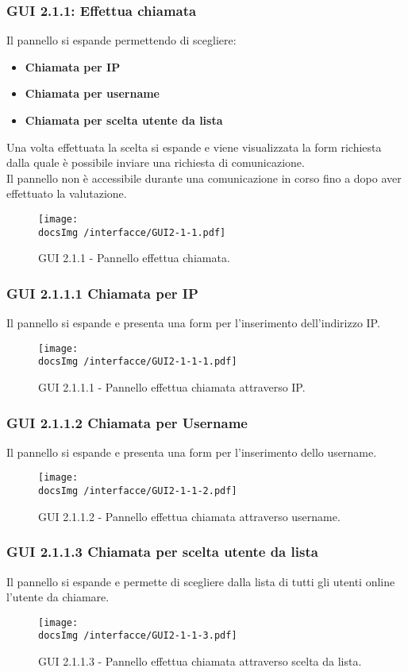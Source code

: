 \subsubsection{GUI 2.1.1: Effettua chiamata}
Il pannello si espande permettendo di scegliere:
\begin{itemize}
\item \textbf{Chiamata per IP\g}
\item \textbf{Chiamata per username}
\item \textbf{Chiamata per scelta utente da lista}
\end{itemize} 
Una volta effettuata la scelta si espande e viene visualizzata la form richiesta dalla quale è possibile inviare una richiesta di comunicazione.\\
Il pannello non è accessibile durante una comunicazione in corso fino a dopo aver effettuato la valutazione.
\begin{figure}[htbp]
\centering
\texttt{[image: \\docsImg /interfacce/GUI2-1-1.pdf]}
\caption{GUI 2.1.1 - Pannello effettua chiamata.}
\end{figure}

\subsubsection{GUI 2.1.1.1 Chiamata per IP}
Il pannello si espande e presenta una form per l’inserimento dell’indirizzo IP\g.
\begin{figure}[htbp]
\centering
\texttt{[image: \\docsImg /interfacce/GUI2-1-1-1.pdf]}
\caption{GUI 2.1.1.1 - Pannello effettua chiamata attraverso IP\g.}
\end{figure}

\subsubsection{GUI 2.1.1.2 Chiamata per Username}
Il pannello si espande e presenta una form per l’inserimento dello username.
\begin{figure}[htbp]
\centering
\texttt{[image: \\docsImg /interfacce/GUI2-1-1-2.pdf]}
\caption{GUI 2.1.1.2 - Pannello effettua chiamata attraverso username.}
\end{figure}

\subsubsection{GUI 2.1.1.3 Chiamata per scelta utente da lista}
Il pannello si espande e permette di scegliere dalla lista di tutti gli utenti online l’utente da chiamare.
\begin{figure}[htbp]
\centering
\texttt{[image: \\docsImg /interfacce/GUI2-1-1-3.pdf]}
\caption{GUI 2.1.1.3 - Pannello effettua chiamata attraverso scelta da lista.}
\end{figure}

